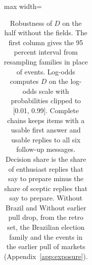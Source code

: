 \begin{table}[t]
\begin{adjustbox}{max width=\linewidth}
\begin{tabular}{lcccccccc}
\bottomrule
\end{tabular}
\end{adjustbox}
\caption{Robustness of $D$ on the half without the fields. The first column gives the 95 percent interval from resampling families in place of events. Log-odds computes $D$ on the log-odds scale with probabilities clipped to [0.01, 0.99]. Complete chains keeps items with a usable first answer and usable replies to all six follow-up messages. Decision share is the share of enthusiast replies that say to prepare minus the share of sceptic replies that say to prepare. Without Brazil and Without earlier pull drop, from the retro set, the Brazilian election family and the events in the earlier pull of markets (Appendix~\ref{app:exposure}).}
\label{tab:drobust}
\end{table}
